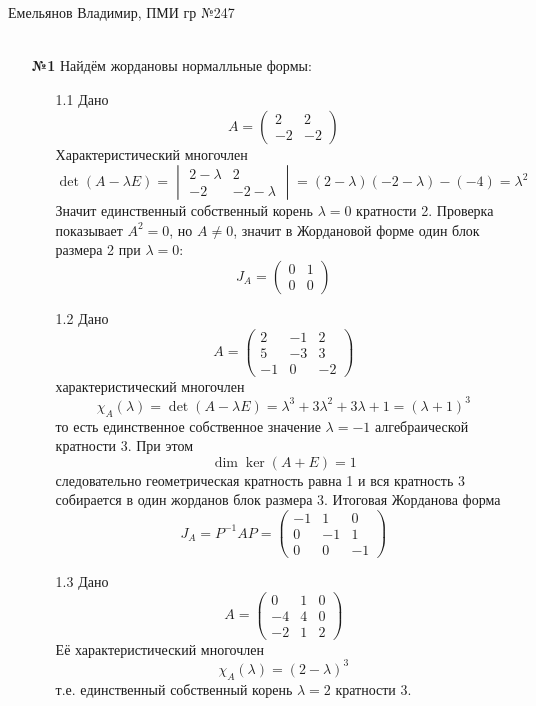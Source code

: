 \documentclass[a4paper]{article}
\begin{document}
\section*{\scalebox{0.9}{Домашнее задание на 13.06 (Линейная алгебра)}}
{\large Емельянов Владимир, ПМИ гр №247}\\\\
\begin{enumerate}
  \item[\textbf{№1}]Найдём жордановы нормалльные формы:
  \begin{enumerate}
    \item[1.1]Дано    
    $$
    A=\begin{pmatrix}2&2\\-2&-2\end{pmatrix}
    $$
    Характеристический многочлен
    $$
    \det(A-\lambda E)=\begin{vmatrix}2-\lambda&2\\-2&-2-\lambda\end{vmatrix}
    =(2-\lambda)(-2-\lambda)-(-4)=\lambda^2
    $$
    Значит единственный собственный корень $\lambda=0$ кратности 2. 
    Проверка показывает $A^2=0$, но $A\neq0$, значит в Жордановой форме 
    один блок размера 2 при $\lambda=0$:
    $$
    J_A=\begin{pmatrix}0&1\\0&0\end{pmatrix}
    $$

    \item[1.2]Дано
    $$
    A=\begin{pmatrix}
    2 & -1 & 2\\
    5 & -3 & 3\\
    -1 & 0 & -2
    \end{pmatrix}
    $$
    характеристический многочлен
    $$
    \chi_A(\lambda)=\det(A-\lambda E)=\lambda^3+3\lambda^2+3\lambda+1=(\lambda+1)^3
    $$
    то есть единственное собственное значение $\lambda=-1$ алгебраической кратности 3. 
    При этом
    $$
    \dim\ker(A+E)=1
    $$
    следовательно геометрическая кратность равна 1 и вся кратность 3 собирается
     в один жорданов блок размера 3. Итоговая Жорданова форма
    $$
    J_A=P^{-1}AP
    =\begin{pmatrix}
    -1 & 1 & 0\\
    0  & -1 & 1\\
    0  & 0  & -1
    \end{pmatrix}
    $$

    \item[1.3]Дано
    $$
    A=\begin{pmatrix}
    0&1&0\\
    -4&4&0\\
    -2&1&2
    \end{pmatrix}
    $$
    Её характеристический многочлен 
    $$\chi_A(\lambda)=(2-\lambda)^3$$
    т.е. единственный собственный корень $\lambda=2$ кратности 3.


\end{enumerate}
\end{enumerate}
\end{document}
